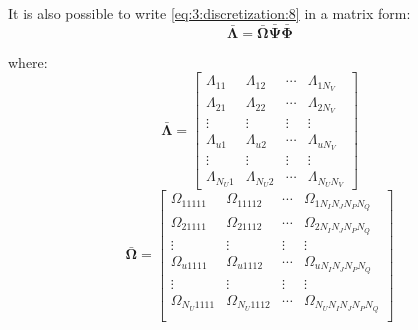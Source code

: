  		It is also possible to write \eqref{eq:3:discretization:8} in a matrix form:
 		\begin{equation}
 			\boldsymbol{\bar{\Lambda}} = \boldsymbol{\bar{\Omega}} \boldsymbol{\bar{\Psi}} \boldsymbol{\bar{\Phi}} \label{eq:3:discretization:12}
 		\end{equation}
 	
 		\noindent where:
 		\begin{equation}
 			\boldsymbol{\bar{\Lambda}} = \begin{bmatrix}
															 	\Lambda_{11} & \Lambda_{12} & \cdots & \Lambda_{1N_V} \\
																\Lambda_{21} & \Lambda_{22} & \cdots & \Lambda_{2N_V} \\
																\vdots & \vdots & \vdots & \vdots \\
																\Lambda_{u1} & \Lambda_{u2} & \cdots & \Lambda_{uN_V} \\
																\vdots & \vdots & \vdots & \vdots \\
																\Lambda_{N_U1} & \Lambda_{N_U2} & \cdots & \Lambda_{N_UN_V}
 														  	\end{bmatrix} \label{eq:discretization:9}
		\end{equation}
		\begin{equation}
 			\boldsymbol{\bar{\Omega}} = \begin{bmatrix}
 														 		\Omega_{11111} & \Omega_{11112} & \cdots & \Omega_{1N_IN_JN_PN_Q} \\
 														 		\Omega_{21111} & \Omega_{21112} & \cdots & \Omega_{2N_IN_JN_PN_Q} \\
 														 		\vdots & \vdots & \vdots & \vdots \\
 														 	 	\Omega_{u1111} & \Omega_{u1112} & \cdots & \Omega_{uN_IN_JN_PN_Q} \\
 														 		\vdots & \vdots & \vdots & \vdots \\
 														 		\Omega_{N_U1111} & \Omega_{N_U1112} & \cdots & \Omega_{N_UN_IN_JN_PN_Q} \\
 														 	\end{bmatrix} \label{eq:discretization:10} %
		\end{equation}
